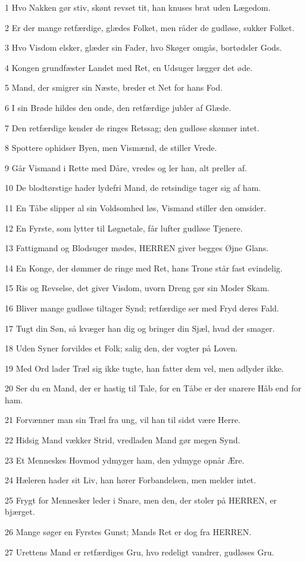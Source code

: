 \par 1 Hvo Nakken gør stiv, skønt revset tit, han knuses brat uden Lægedom.
\par 2 Er der mange retfærdige, glædes Folket, men råder de gudløse, sukker Folket.
\par 3 Hvo Visdom elsker, glæder sin Fader, hvo Skøger omgås, bortødsler Gods.
\par 4 Kongen grundfæster Landet med Ret, en Udsuger lægger det øde.
\par 5 Mand, der smigrer sin Næste, breder et Net for hans Fod.
\par 6 I sin Brøde hildes den onde, den retfærdige jubler af Glæde.
\par 7 Den retfærdige kender de ringes Retssag; den gudløse skønner intet.
\par 8 Spottere ophidser Byen, men Vismænd, de stiller Vrede.
\par 9 Går Vismand i Rette med Dåre, vredes og ler han, alt preller af.
\par 10 De blodtørstige hader lydefri Mand, de retsindige tager sig af ham.
\par 11 En Tåbe slipper al sin Voldsomhed løs, Vismand stiller den omsider.
\par 12 En Fyrste, som lytter til Løgnetale, får lufter gudløse Tjenere.
\par 13 Fattigmand og Blodsuger mødes, HERREN giver begges Øjne Glans.
\par 14 En Konge, der dømmer de ringe med Ret, hans Trone står fast evindelig.
\par 15 Ris og Revselse, det giver Visdom, uvorn Dreng gør sin Moder Skam.
\par 16 Bliver mange gudløse tiltager Synd; retfærdige ser med Fryd deres Fald.
\par 17 Tugt din Søn, så kvæger han dig og bringer din Sjæl, hvad der smager.
\par 18 Uden Syner forvildes et Folk; salig den, der vogter på Loven.
\par 19 Med Ord lader Træl sig ikke tugte, han fatter dem vel, men adlyder ikke.
\par 20 Ser du en Mand, der er hastig til Tale, for en Tåbe er der snarere Håb end for ham.
\par 21 Forvænner man sin Træl fra ung, vil han til sidst være Herre.
\par 22 Hidsig Mand vækker Strid, vredladen Mand gør megen Synd.
\par 23 Et Menneskes Hovmod ydmyger ham, den ydmyge opnår Ære.
\par 24 Hæleren hader sit Liv, han hører Forbandelsen, men melder intet.
\par 25 Frygt for Mennesker leder i Snare, men den, der stoler på HERREN, er bjærget.
\par 26 Mange søger en Fyrstes Gunst; Mands Ret er dog fra HERREN.
\par 27 Urettens Mand er retfærdiges Gru, hvo redeligt vandrer, gudløses Gru.

